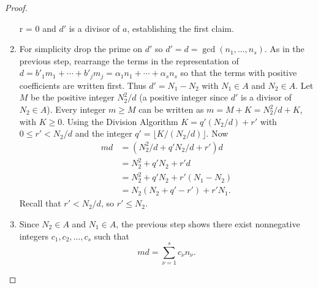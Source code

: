 \documentclass[12pt]{article}
\begin{document}
\begin{proof}
\begin{enumerate}
            r = 0 \) and \( d' \) is a divisor of \( a \), establishing
            the first claim.
        \item
          For simplicity drop the prime on \( d' \) so
          \( d' = d = \gcd(n_1, \dots, n_s) \).  As in the previous step,
            rearrange the terms in the representation of \( d = b'_1 m_1
            + \cdots + b'_j m_j = \alpha_1 n_1 + \cdots + \alpha_s n_s \) so that
            the terms with positive coefficients are written first.
            Thus \( d' = N_1 - N_2 \) with \( N_1 \in A \) and \( N_2 \in
            A \). Let \( M \) be the positive integer \( N_2^2/d \)
            (a positive integer since \( d' \) is a divisor of
            \(N_{2}\in A\)).
            Every integer \( m \ge M \) can be written as \( m = M + K =
            N_2^2/d + K \), with \( K \ge 0 \).  Using the Division
            Algorithm \( K = q' (N_2/d) + r' \) with \( 0 \le r' < N_2/d \)
            and the integer \( q' = \lfloor K/(N_2/d) \rfloor \).  Now
            \begin{align*}
              md &= (N_2^2/d + q' N_2/d + r') d \\
                 &= N_2^2 + q'N_2 + r'd \\
                 &= N_2^2 + q'N_2 + r'(N_1 - N_2) \\
                 &= N_2(N_2 + q' -r') + r' N_1.
            \end{align*}
            Recall that \( r' < N_2/d \), so \( r' \le N_2 \).
        \item
            Since \( N_2 \in A \) and \( N_1 \in A \), the previous
            step shows there exist
            nonnegative integers \( c_1, c_2, \dots, c_s \) such that
            \[
              md = \sum\limits_{\nu=1}^s c_\nu n_\nu.
            \]
    \end{enumerate}
\end{proof}
\end{document}
